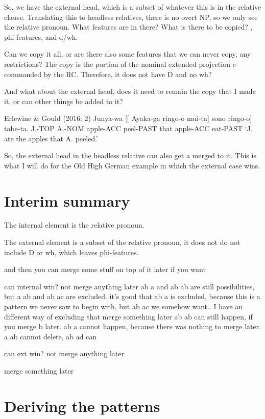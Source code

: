 So, we have the external head, which is a subset of whatever this is in the relative clause. Translating this to headless relatives, there is no overt NP, so we only see the relative pronoun. What features are in there? What is there to be copied? , phi features, and d/wh.

Can we copy it all, or are there also some features that we can never copy, any restrictions? The copy is the portion of the nominal extended projection c-commanded by the RC. Therefore, it does not have D and no wh?

And what about the external head, does it need to remain the copy that I made it, or can other things be added to it?

Erlewine \& Gould (2016: 2)
Junya-wa [[ Ayaka-ga ringo-o mui-ta] sono ringo-o] tabe-ta.
J.-TOP A.-NOM apple-ACC peel-PAST that apple-ACC eat-PAST
‘J. ate the apples that A. peeled.’

So, the external head in the headless relative can also get a  merged to it. This is what I will do for the Old High German example in which the external case wins.




\section{Interim summary}\label{sec:interim-summary-proposal}

The internal element is the relative pronoun.

The external element is a subset of the relative pronoun, it does not do not include D or wh, which leaves phi-features.

and then you can merge some stuff on top of it later if you want

can internal win?
  not merge anything later
    ab a and ab ab are still possibilities, but a ab and ab ac are excluded. it's good that ab a is excluded, because this is a pattern we never saw to begin with, but ab ac we somehow want.. I have an different way of excluding that
  merge something later
    ab ab can still happen, if you merge b later. ab a cannot happen, because there was nothing to merge later. a ab cannot delete, ab ad can

can ext win?
  not merge anything later

  merge something later





\section{Deriving the patterns}\label{sec:deriving-languages}

